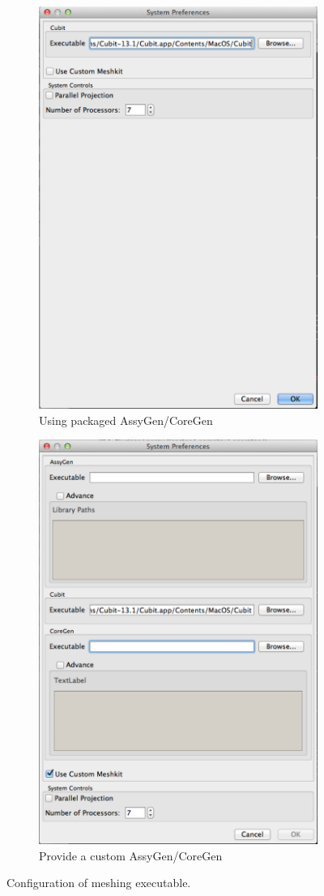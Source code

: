 \begin{figure}
\centering
\begin{subfigure}{.5\textwidth}
  \centering
  \includegraphics[width=0.6\linewidth]{Images/packaged_meshkit.png}
  \caption{Using packaged AssyGen/CoreGen}
  \label{fig:prefDefault}
\end{subfigure}%
\begin{subfigure}{.5\textwidth}
  \centering
  \includegraphics[width=0.6\linewidth]{Images/custom_meshkit.png}
  \caption{Provide a custom AssyGen/CoreGen}
  \label{fig:prefCustom}
\end{subfigure}
\caption{Configuration of meshing executable.}
\label{fig:configOptions}
\end{figure}


